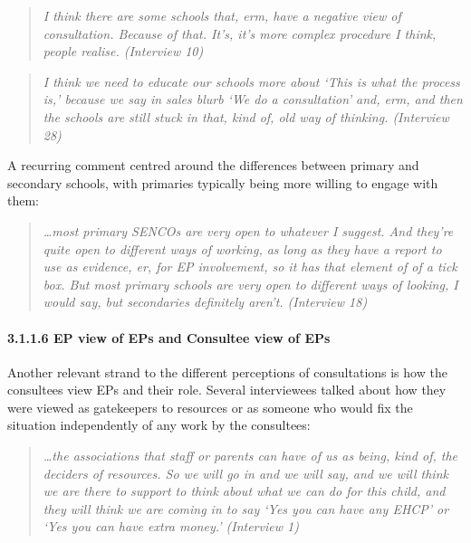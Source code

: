 \documentclass[
  english,
  man]{apa7}
\let\oldparagraph\paragraph
\renewcommand{\paragraph}[1]{\oldparagraph{#1}\mbox{}}
\begin{document}
\begin{quote}
\emph{I think there are some schools that, erm, have a negative view of
consultation. Because of that. It's, it's more complex procedure I
think, people realise. (Interview 10)}
\end{quote}

\begin{quote}
\emph{I think we need to educate our schools more about `This is what the
process is,' because we say in sales blurb `We do a consultation' and,
erm, and then the schools are still stuck in that, kind of, old way of
thinking. (Interview 28)}
\end{quote}

A recurring comment centred around the differences between primary and secondary schools, with primaries typically being more willing to engage with them:

\begin{quote}
\emph{\ldots most primary SENCOs are very open to whatever I suggest. And they're
quite open to different ways of working, as long as they have a report
to use as evidence, er, for EP involvement, so it has that element of
of a tick box. But most primary schools are very open to different
ways of looking, I would say, but secondaries definitely aren't.
(Interview 18)}
\end{quote}

\hypertarget{ep-view-of-eps-and-consultee-view-of-eps}{%
\paragraph{3.1.1.6 EP view of EPs and Consultee view of EPs}\label{ep-view-of-eps-and-consultee-view-of-eps}}

Another relevant strand to the different perceptions of consultations is how the consultees view EPs and their role. Several interviewees talked about how they were viewed as gatekeepers to resources or as someone who would fix the situation independently of any work by the consultees:

\begin{quote}
\emph{\ldots the associations that staff or parents can have of us as being, kind
of, the deciders of resources. So we will go in and we will say, and
we will think we are there to support to think about what we can do
for this child, and they will think we are coming in to say `Yes you
can have any EHCP' or `Yes you can have extra money.' (Interview 1)}
\end{quote}
\end{document}
